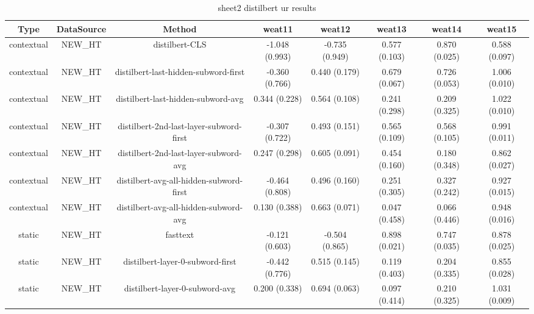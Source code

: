 \begin{sidewaystable}[htb]
    \centering
    \caption{sheet2 distilbert ur results}
    \label{appendix_tab:sheet2_distilbert_ur_results}
    \small
    \begin{tabular}{@{}cccccccc@{}}
        \toprule
        Type & DataSource & Method & weat11 & weat12 & weat13 & weat14 & weat15 \\
        \midrule
        contextual & NEW\_HT & distilbert-CLS & -1.048 (0.993) & -0.735 (0.949) & 0.577 (0.103) & 0.870 (0.025) & 0.588 (0.097) \\
        contextual & NEW\_HT & distilbert-last-hidden-subword-first & -0.360 (0.766) & 0.440 (0.179) & 0.679 (0.067) & 0.726 (0.053) & 1.006 (0.010) \\
        contextual & NEW\_HT & distilbert-last-hidden-subword-avg & 0.344 (0.228) & 0.564 (0.108) & 0.241 (0.298) & 0.209 (0.325) & 1.022 (0.010) \\
        contextual & NEW\_HT & distilbert-2nd-last-layer-subword-first & -0.307 (0.722) & 0.493 (0.151) & 0.565 (0.109) & 0.568 (0.105) & 0.991 (0.011) \\
        contextual & NEW\_HT & distilbert-2nd-last-layer-subword-avg & 0.247 (0.298) & 0.605 (0.091) & 0.454 (0.160) & 0.180 (0.348) & 0.862 (0.027) \\
        contextual & NEW\_HT & distilbert-avg-all-hidden-subword-first & -0.464 (0.808) & 0.496 (0.160) & 0.251 (0.305) & 0.327 (0.242) & 0.927 (0.015) \\
        contextual & NEW\_HT & distilbert-avg-all-hidden-subword-avg & 0.130 (0.388) & 0.663 (0.071) & 0.047 (0.458) & 0.066 (0.446) & 0.948 (0.016) \\
        static & NEW\_HT & fasttext & -0.121 (0.603) & -0.504 (0.865) & 0.898 (0.021) & 0.747 (0.035) & 0.878 (0.025) \\
        static & NEW\_HT & distilbert-layer-0-subword-first & -0.442 (0.776) & 0.515 (0.145) & 0.119 (0.403) & 0.204 (0.335) & 0.855 (0.028) \\
        static & NEW\_HT & distilbert-layer-0-subword-avg & 0.200 (0.338) & 0.694 (0.063) & 0.097 (0.414) & 0.210 (0.325) & 1.031 (0.009) \\
        \bottomrule
    \end{tabular}
\end{sidewaystable}